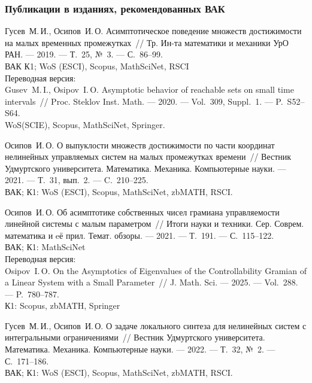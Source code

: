 \subsubsection*{Публикации в изданиях, рекомендованных ВАК}
Гусев~М.\,И., Осипов~И.\,О. Асимптотическое поведение множеств достижимости на малых временных промежутках~// Тр. Ин-та математики и механики УрО РАН. --- 2019. --- Т.~25, №~3. --- С.~86--99.
 \\
ВАК К1; WoS (ESCI), Scopus, MathSciNet, RSCI
\\ Переводная версия: \\
Gusev~M.\,I., Osipov~I.\,O. Asymptotic behavior of reachable sets on small time intervals~// Proc. Steklov Inst. Math. --- 2020. --- Vol.~309, Suppl.~1. --- P.~S52--S64. \\
WoS(SCIE), Scopus, MathSciNet, Springer.

Осипов~И.\,О. О выпуклости множеств достижимости по части координат нелинейных управляемых систем на малых промежутках времени~// Вестник Удмуртского университета. Математика. Механика. Компьютерные науки. --- 2021. --- Т.~31, вып.~2. --- C.~210--225.
 \\
 ВАК; К1: WoS (ESCI), Scopus, MathSciNet, zbMATH, RSCI.

Осипов~И.\,О. Об асимптотике собственных чисел грамиана управляемости линейной системы с малым параметром~// Итоги науки и техники. Сер. Соврем. математика и eё прил. Темат. обзоры. --- 2021. --- Т.~191. --- С.~115--122.
\\ ВАК; К1: MathSciNet
\\Переводная версия: \\
Osipov~I.\,O. On the Asymptotics of Eigenvalues of the Controllability Gramian of a Linear System with a Small Parameter~// J. Math. Sci. --- 2025. --- Vol.~288. --- P.~780--787. 
 \\
К1: Scopus, zbMATH, Springer

Гусев~М.\,И., Осипов~И.\,О. О задаче локального синтеза для нелинейных систем с интегральными ограничениями~// Вестник Удмуртского университета. Математика. Механика. Компьютерные науки. --- 2022. --- Т.~32, №~2. --- С.~171--186. 
 \\
 ВАК; К1: WoS (ESCI), Scopus, MathSciNet, zbMATH, RSCI.


